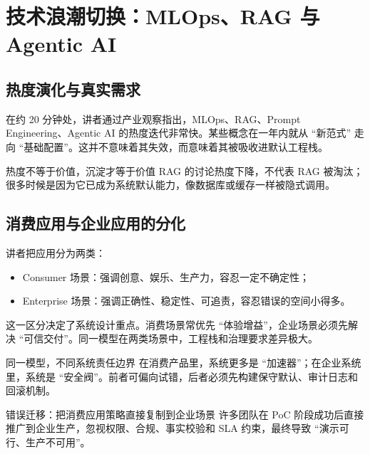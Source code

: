 \section{技术浪潮切换：MLOps、RAG 与 Agentic AI}

\subsection{热度演化与真实需求}
在约 20 分钟处，讲者通过产业观察指出，MLOps、RAG、Prompt Engineering、Agentic AI 的热度迭代非常快。某些概念在一年内就从 ``新范式'' 走向 ``基础配置''。这并不意味着其失效，而意味着其被吸收进默认工程栈。

\begin{importantbox}{热度不等于价值，沉淀才等于价值}
RAG 的讨论热度下降，不代表 RAG 被淘汰；很多时候是因为它已成为系统默认能力，像数据库或缓存一样被隐式调用。
\end{importantbox}

\subsection{消费应用与企业应用的分化}
讲者把应用分为两类：
\begin{itemize}
    \item Consumer 场景：强调创意、娱乐、生产力，容忍一定不确定性；
    \item Enterprise 场景：强调正确性、稳定性、可追责，容忍错误的空间小得多。
\end{itemize}

这一区分决定了系统设计重点。消费场景常优先 ``体验增益''，企业场景必须先解决 ``可信交付''。同一模型在两类场景中，工程栈和治理要求差异极大。

\begin{knowledgebox}{同一模型，不同系统责任边界}
在消费产品里，系统更多是 ``加速器''；在企业系统里，系统是 ``安全阀''。前者可偏向试错，后者必须先构建保守默认、审计日志和回滚机制。
\end{knowledgebox}

\begin{warningbox}{错误迁移：把消费应用策略直接复制到企业场景}
许多团队在 PoC 阶段成功后直接推广到企业生产，忽视权限、合规、事实校验和 SLA 约束，最终导致 ``演示可行、生产不可用''。
\end{warningbox}

